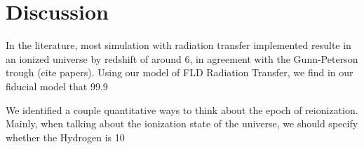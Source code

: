 
\section{Discussion}
\label{Discussion}


In the literature, most simulation with radiation transfer implemented resulte in an ionized universe by redshift of around 6, in agreement with the Gunn-Peterson trough (cite papers).  Using our model of FLD Radiation Transfer, we find in our fiducial model that 99.9%

We identified a couple quantitative ways to think about the epoch of reionization.  Mainly, when talking about the ionization state of the universe, we should specify whether the Hydrogen is 10%

